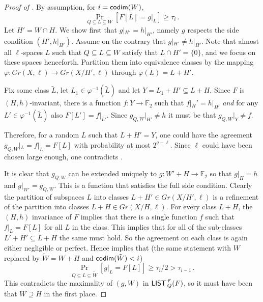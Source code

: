 \documentclass{toc}
\newcommand\Prob[2]{{\Pr_{#1}\left[ {#2} \right]}}
\newcommand*\codimm{{\sf codim}}
\renewcommand\ge{\geqslant}
\renewcommand\subset{\subseteq}
\renewcommand\supset{\supseteq}
\def\M{{\sf LIST\,}}
\def\F{\mathbb{F}}
\begin{document}
\begin{proof}[Proof of ]
By assumption, for $i = \codimm(W)$,
\begin{equation}\label{eq:occur} \Prob{Q\subset L\subset W}{F[L] = g|_L} \ge \tau_i\,.
\end{equation}
%
Let $H' = W \cap H$. We show first that $g|_{H'} =h|_{H'}$, namely  $g$  respects the side condition $(H',h|_{H'})$. Assume on the contrary that $g|_{H'} \neq h|_{H'}$.
Note that almost all $\ell$-spaces $L$ such that $Q\subseteq L\subseteq W$ satisfy that $L\cap H' = \{0\}$, and
we focus on these spaces henceforth. Partition them %
%
%
%
%
%
into equivalence classes by the mapping  $\varphi:Gr(X,\ell)\to Gr(X/H',\ell)$ through $\varphi(L)= L+H'$.

Fix some class $\tilde L$, let $L_1\in \varphi^{-1}(\tilde L)$ and let $Y = L_1+H' \subset L+H$. Since $F$ is $(H,h)$-invariant, there is a function $f:Y\to\F_2$ such that $f|_H' = h|_{H'}$ {\em and} for any $L' \in \varphi^{-1}(\tilde L)$ also $F[L'] = f|_{L'}$.
%
Since $g_{Q,W}|_{H'} \neq h$ it must be that $g_{Q,W}|_{Y} \neq f$.

Therefore, for a random $L$ such that $L+H'=Y$, one could have the agreement $g_{Q,W}|_L = f|_L= F[L]$ with probability at most $2^{q-\ell}$. Since $\ell$ could have been chosen large enough, one contradicts .

It is clear that $g_{Q,W}$ can be extended uniquely to $g:W'+H\to\F_2$ so that $g|_H = h$ and $g|_{W'} = g_{Q,W}$. This is a function that satisfies the full side condition.
Clearly the partition of subspaces $L$ into classes $L+H' \in Gr(X/H',\ell)$ is a refinement of the partition into classes $L+H \in Gr(X/H,\ell)$.
For every class $L+H$, the $(H,h)$ invariance of $F$ implies that there is a single function $f$ such that $f|_L = F[L]$ for all $L$ in the class. This implies that for all of the sub-classes $L'+H' \subset L+H$ the same must hold. So the agreement on each class is again either negligible or perfect.
Hence  implies that (the same statement with $W$ replaced by $\tilde W=W+H$ and $\codimm(\tilde W) < i$)
\begin{equation} \label{eq:w-tilde}
  \Prob{Q\subset L \subset \tilde W}{{g}|_L = F[L]}\ge  \tau_i/2 > \tau_{i-1}\,.
 \end{equation}
 This contradicts the maximality of $(g,W)$ in $\M_Q^{\vec\tau}(F)$, so it must have been that $W\supset H$ in the first place.
\end{proof}
\end{document}
